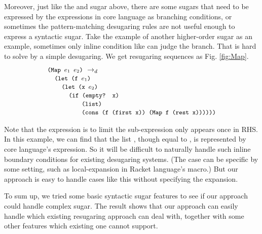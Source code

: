 Moreover, just like the  and  sugar above, there are some sugars that need to be expressed by the expressions in core language as branching conditions, or sometimes the pattern-matching desugaring rules are not useful enough to express a syntactic sugar. Take the example of another higher-order sugar  as an example, sometimes only inline condition like  can judge the branch. That is hard to solve by a simple desugaring. We get resugaring sequences as Fig.  \ref{fig:Map}.
\[
\begin{array}{l}
\texttt{\small(Map $e_1$ $e_2$)} ~\rightarrow_d~\\
\quad\texttt{\small (let (f $e_1$)}\\
\qquad\texttt{\small(let (x $e_2$)}\\
\qquad\quad

\texttt{\small(if (empty? x)}\\
\qquad\qquad\;\;\;\texttt{\small(list)}\\
\qquad\qquad\;\;\;\texttt{\small(cons (f (first x)) (Map f (rest x))))))}


\end{array}
\]



Note that the  expression is to limit the sub-expression only appears once in RHS. In this example, we can find that the list , though equal to , is represented by core language's expression. So it will be difficult to naturally handle such inline boundary conditions for existing desugaring systems. (The case can be specific by some setting, such as local-expansion\cite{10.1017/S0956796812000093} in Racket language's macro.) But our approach is easy to handle cases like this without specifying the expansion.

To sum up, we tried some basic syntactic sugar features to see if our approach could handle complex sugar. The result shows that our approach can easily handle which existing resugaring approach can deal with, together with some other features which existing one cannot support.

